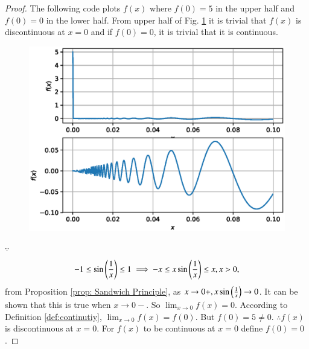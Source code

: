 \documentclass[journal,12pt,twocolumn]{IEEEtran}
\begin{document}
\begin{proof}
The following code plots $f(x)$ where $f(0)=5$ in the upper half and $f(0)=0$ in the lower half. From upper half of Fig. \ref{fig:7} it is trivial that $f(x)$ is discontinuous at $x=0$ and if $f(0)=0$, it is trivial that it is continuous.

%
\begin{figure}[!ht]
\begin{center}
\includegraphics[width=\columnwidth]{./figs/7.eps}
\end{center}
\label{fig:7}	
\end{figure} 
%
$\because$
\begin{align}
-1\le \sin\left(\frac{1}{x}\right) \le 1 \implies -x\leq x\sin\left(\frac{1}{x}\right) \leq x, x > 0,
\end{align} 
from Proposition \ref{prop: Sandwich Principle}, as $x\to 0+, x\sin \left(\frac{1}{x}\right) \to 0$. It can be shown that this is true when
$x \to 0-$.
So $\lim_{x \to 0} f(x) = 0$. According to Definition \ref{def:continutiy}, $\lim_{x \to 0} f(x) = f(0)$.
But $f(0)=5\neq 0$. $\therefore f(x)$ is discontinuous at $x=0$.
For $f(x)$ to be continuous at $x=0$ define $f(0) = 0$.
\end{proof}
\end{document}
